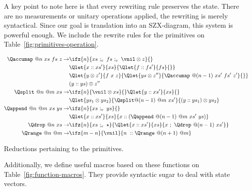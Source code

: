 A key point to note here is that every rewriting rule preserves the state. There are no measurements or unitary operations applied, the rewriting is merely syntactical. Since our goal is translation into an SZX-diagram, this system is powerful enough. We include the rewrite rules for the primitives on Table~\ref{fig:primitives-operation}.

\begin{table}[htbp]
    \begin{mdframed}
        \begin{align*}
        \Qaccumap\ @n\ xs\ fs\ z \to
          & \ifz{n}{xs\ ;_v\ fs\ ;_v\ \vnil\otimes z}{}\\
          & \Qlet{x :: xs'}{xs}{\Qlet{f :: fs'}{fs}{}}\\
          & \Qlet{y\otimes z'}{f\ x\ z}{\Qlet{ys \otimes z''}{\Qaccumap\ @(n-1)\ xs'\ fs'\ z'}{}}\\
          & (y :: ys) \otimes z''\\
        \Qsplit\ @n\ @m\ xs \to
          & \ifz{n}{\vnil\otimes xs}{} \Qlet{y :: xs'}{xs}{}\\
          & \Qlet{ys_1\otimes ys_2}{\Qsplit @(n-1)\ @m\ xs'}{(y :: ys_1)\otimes ys_2}\\
        \Qappend\ @n\ @m\ xs\ ys \to
          & \ifz{n}{xs\ ;_v\ ys}{} \\
          & \Qlet{x :: xs'}{xs}{x :: (\Qappend\ @(n-1)\ @m\ xs'\ ys)}\\
        \Qdrop\ @n\ xs \to
          & \ifz{n}{xs\ ;_v\ \star}{\Qlet{x :: xs'}{xs}{x\ ;\ \Qdrop\ @(n-1)\ xs'}}\\
        \Qrange\ @n\ @m \to
          & \ifz{m-n}{\vnil}{n\ :: \Qrange\ @(n+1)\ @m}\\
        \end{align*}
        \caption{Reductions pertaining to the primitives.}
        \label{fig:primitives-operation}
        \end{mdframed}
    \end{table}

Additionally, we define useful macros based on these functions on Table~\ref{fig:function-macros}. They provide syntactic sugar to deal with state vectors.


